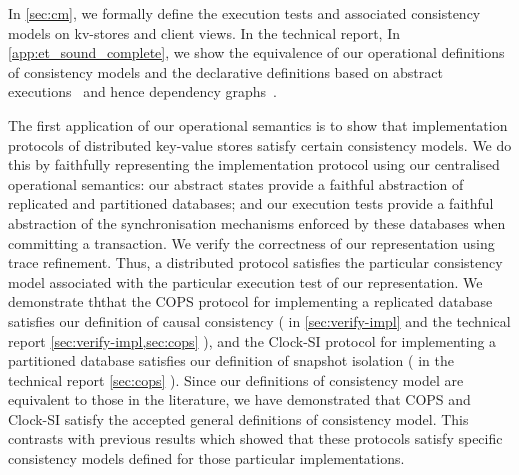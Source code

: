 In \cref{sec:cm}, we formally define the  execution tests and 
associated consistency models on kv-stores and client views. 
\ifTechRepEdits%
In the technical report,
\else%
In \cref{app:et_sound_complete},
\fi
we show the equivalence of our operational definitions of consistency
models and 
the declarative definitions  based on abstract executions~\cite{.} and
hence dependency graphs~\cite{jade,cerone}. 




The first application of our operational
semantics is to show that  implementation protocols  of distributed
key-value stores satisfy certain consistency models. We do this by
faithfully representing the implementation protocol using our centralised
operational semantics: our abstract states provide a faithful abstraction of replicated and partitioned
databases; and our execution tests provide a faithful abstraction of the synchronisation mechanisms 
enforced by these databases when committing a transaction. 
We  verify the correctness of our representation 
using trace refinement. Thus, a distributed protocol
satisfies  the particular consistency model associated with the
particular execution
test of our representation. 
We demonstrate ththat the COPS protocol \citep{cops} for implementing
a replicated database satisfies our definition of causal consistency (%
\ifTechRepEdits%
in \cref{sec:verify-impl} and the technical report%
\else%
\cref{sec:verify-impl,sec:cops}%
\fi%
), and the Clock-SI protocol \citep{clocksi} for implementing a
partitioned database satisfies our definition of snapshot isolation (%
\ifTechRepEdits%
in the technical report%
\else%
\cref{sec:cops}%
\fi%
).  Since our definitions of consistency model are equivalent to those
in the literature, we have demonstrated that COPS and Clock-SI satisfy
the accepted general definitions of consistency model. This contrasts
with 
previous results which showed that these protocols satisfy specific
consistency models  defined for those
particular implementations.


